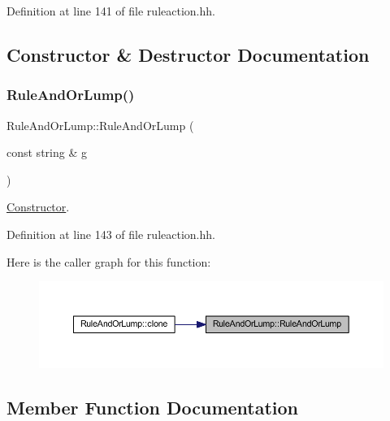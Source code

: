 Definition at line 141 of file ruleaction.\+hh.



\subsection{Constructor \& Destructor Documentation}
\mbox{\label{class_rule_and_or_lump_a4515fe1d4cbd72366b5e757da8afa5b9}} 
\subsubsection{\texorpdfstring{RuleAndOrLump()}{RuleAndOrLump()}}
{\footnotesize\ttfamily Rule\+And\+Or\+Lump\+::\+Rule\+And\+Or\+Lump (\begin{DoxyParamCaption}\item[{const string \&}]{g }\end{DoxyParamCaption})\hspace{0.3cm}{\ttfamily [inline]}}



\mbox{\hyperlink{class_constructor}{Constructor}}. 



Definition at line 143 of file ruleaction.\+hh.

Here is the caller graph for this function\+:
\nopagebreak
\begin{figure}[H]
\begin{center}
\leavevmode
\includegraphics[width=350pt]{class_rule_and_or_lump_a4515fe1d4cbd72366b5e757da8afa5b9_icgraph}
\end{center}
\end{figure}


\subsection{Member Function Documentation}
\mbox{\label{class_rule_and_or_lump_aff7dd54db4bd5474329200371c8a3146}} 
